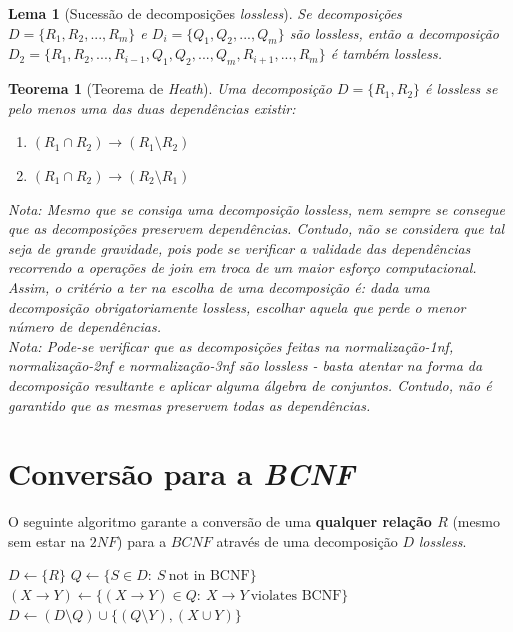 \documentclass[oneside]{book}
\newtheorem{theorem}{Teorema}
\newtheorem{lemma}{Lema}
\theoremstyle{definition}
\begin{document}
\begin{lemma} [Sucessão de decomposições \textit{lossless}]
    Se decomposições $D = \{R_1, R_2, ..., R_m\}$ e $D_i = \{Q_1, Q_2, ..., Q_m\}$ são \textit{lossless}, então a decomposição $D_2 = \{ R_1, R_2, ..., R_{i - 1}, Q_1, Q_2, ..., Q_m, R_{i + 1}, ...,  R_m\}$ é também \textit{lossless}.
\end{lemma}

\begin{theorem} [Teorema de \textit{Heath}]
    Uma decomposição $D = \{R_1, R_2\}$ é \textit{lossless} se pelo menos uma das duas dependências existir:
    \begin{enumerate}
        \item $(R_1 \cap R_2) \rightarrow (R_1 \setminus R_2)$
        \item  $(R_1 \cap R_2) \rightarrow (R_2 \setminus R_1)$
    \end{enumerate}
\end{theorem}

\textit{Nota: Mesmo que se consiga uma decomposição lossless, nem sempre se consegue que as decomposições preservem dependências. Contudo, não se considera que tal seja de grande gravidade, pois pode se verificar a validade das dependências recorrendo a operações de join em troca de um maior esforço computacional. Assim, o critério a ter na escolha de uma decomposição é: dada uma decomposição obrigatoriamente lossless, escolhar aquela que perde o menor número de dependências.} \\

\textit{Nota: Pode-se verificar que as decomposições feitas na normalização-1nf, normalização-2nf e normalização-3nf são lossless - basta atentar na forma da decomposição resultante e aplicar alguma álgebra de conjuntos. Contudo, não é garantido que as mesmas preservem todas as dependências.}

\section{Conversão para a \textit{BCNF}}

O seguinte algoritmo garante a conversão de uma \textbf{qualquer relação $R$} (mesmo sem estar na $2NF$) para a $BCNF$ através de uma decomposição $D$ \textit{lossless}.

\begin{algorithm}
    \caption{Algoritmo de conversão para a $BCNF$}\label{alg:cap}
    \begin{algorithmic}
    \State $D \gets \{R\}$
        \State $Q \gets \{S \in D : \: S \: \text{not in BCNF}\}$
        \State $(X \rightarrow Y) \gets \{(X \rightarrow Y) \in Q : \: X \rightarrow Y \: \text{violates BCNF}\}$
        \State $D \gets (D \setminus Q) \cup \{(Q \setminus Y), (X \cup Y)\}$
    \EndWhile
    \end{algorithmic}
 \end{algorithm}
\end{document}
